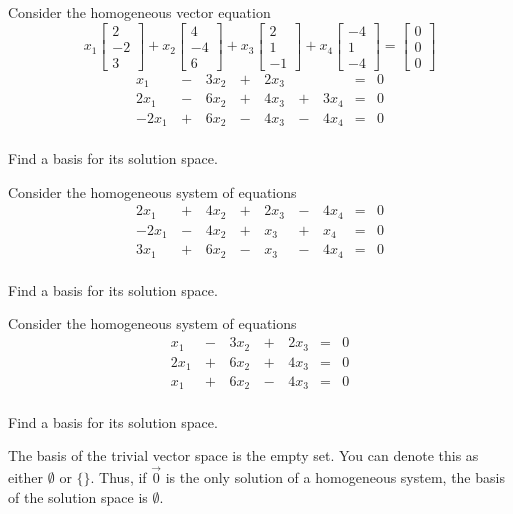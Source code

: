 \begin{activity}{10}
Consider the homogeneous vector equation
\[ 
   x_1 \begin{bmatrix} 2 \\ -2 \\ 3 \end{bmatrix}+
   x_2 \begin{bmatrix} 4 \\ -4 \\ 6 \end{bmatrix}+
   x_3 \begin{bmatrix} 2 \\ 1 \\ -1 \end{bmatrix}+
   x_4 \begin{bmatrix} -4 \\ 1 \\ -4 \end{bmatrix}=
       \begin{bmatrix} 0 \\ 0 \\ 0 \end{bmatrix}
\]
\begin{alignat*}{5}
x_1&\,-\,&3x_2&\,+\,& 2x_3&\,\,&  &=& 0 \\
2x_1&\,-\,&6x_2&\,+\,&4x_3 &\,+\,&3 x_4 &=& 0 \\
-2x_1&\,+\,&6x_2&\,-\,&4x_3 &\,-\,&4 x_4 &=& 0 \\
\end{alignat*}

Find a basis for its solution space.
\end{activity}

\begin{activity}{10}
Consider the homogeneous system of equations
\begin{alignat*}{5}
2x_1&\,+\,&4x_2&\,+\,& 2x_3&\,-\,&4x_4  &=& 0 \\
-2x_1&\,-\,&4x_2&\,+\,&x_3 &\,+\,& x_4 &=& 0 \\
3x_1&\,+\,&6x_2&\,-\,&x_3 &\,-\,&4 x_4 &=& 0 \\
\end{alignat*}

Find a basis for its solution space.
\end{activity}

\begin{activity}{5}
Consider the homogeneous system of equations
\begin{alignat*}{5}
x_1&\,-\,&3x_2&\,+\,& 2x_3  &=& 0 \\
2x_1&\,+\,&6x_2&\,+\,&4x_3  &=& 0 \\
x_1&\,+\,&6x_2&\,-\,&4x_3 &=& 0 \\
\end{alignat*}

Find a basis for its solution space.
\end{activity}

\begin{observation}
The basis of the trivial vector space is the empty set.  You can denote this as either \(\emptyset\) or \(\{\}\).
\vfill
Thus, if \(\vec{0}\) is the only solution of a homogeneous system, the basis of the solution space is  \(\emptyset\).
\end{observation}


